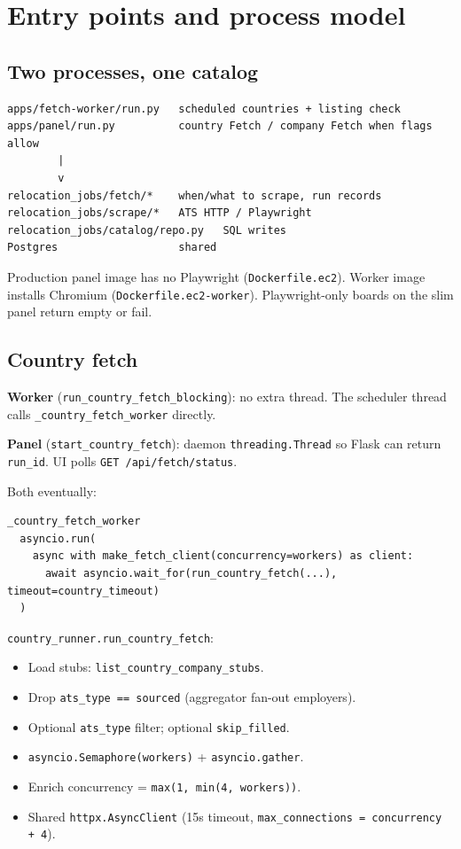 \documentclass[11pt,a4paper]{article}
\begin{document}
\section{Entry points and process model}

\subsection{Two processes, one catalog}

\begin{lstlisting}
apps/fetch-worker/run.py   scheduled countries + listing check
apps/panel/run.py          country Fetch / company Fetch when flags allow
        |
        v
relocation_jobs/fetch/*    when/what to scrape, run records
relocation_jobs/scrape/*   ATS HTTP / Playwright
relocation_jobs/catalog/repo.py   SQL writes
Postgres                   shared
\end{lstlisting}

Production panel image has no Playwright (\texttt{Dockerfile.ec2}). Worker
image installs Chromium (\texttt{Dockerfile.ec2-worker}). Playwright-only
boards on the slim panel return empty or fail.

\subsection{Country fetch}

\textbf{Worker} (\texttt{run\_country\_fetch\_blocking}): no extra thread. The
scheduler thread calls \texttt{\_country\_fetch\_worker} directly.

\textbf{Panel} (\texttt{start\_country\_fetch}): daemon
\texttt{threading.Thread} so Flask can return \texttt{run\_id}. UI polls
\texttt{GET /api/fetch/status}.

Both eventually:

\begin{lstlisting}
_country_fetch_worker
  asyncio.run(
    async with make_fetch_client(concurrency=workers) as client:
      await asyncio.wait_for(run_country_fetch(...), timeout=country_timeout)
  )
\end{lstlisting}

\texttt{country\_runner.run\_country\_fetch}:

\begin{itemize}
  \item Load stubs: \texttt{list\_country\_company\_stubs}.
  \item Drop \texttt{ats\_type == sourced} (aggregator fan-out employers).
  \item Optional \texttt{ats\_type} filter; optional \texttt{skip\_filled}.
  \item \texttt{asyncio.Semaphore(workers)} + \texttt{asyncio.gather}.
  \item Enrich concurrency = \texttt{max(1, min(4, workers))}.
  \item Shared \texttt{httpx.AsyncClient} (15s timeout,
        \texttt{max\_connections = concurrency + 4}).
\end{itemize}
\end{document}
